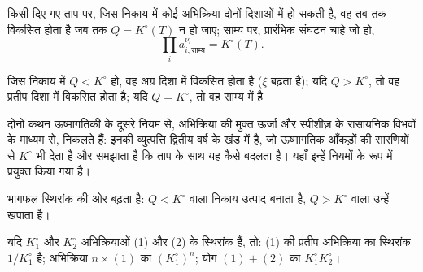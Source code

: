 \begin{theorem}[द्रव्य-अनुपाती क्रिया का नियम]\label{thm:b1:extent-q-and-k:mass-action}
किसी दिए गए ताप पर, जिस निकाय में कोई अभिक्रिया दोनों दिशाओं में
हो सकती है, वह तब तक विकसित होता है जब तक $Q = K^\circ(T)$ न हो जाए; साम्य पर,
प्रारंभिक संघटन चाहे जो हो,
\[
  \prod_i a_{i,\text{साम्य}}^{\nu_i} = K^\circ(T) .
\]
\end{theorem}
\admitted

\begin{proposition}[विकास की दिशा]\label{prop:b1:extent-q-and-k:direction}
जिस निकाय में $Q < K^\circ$ हो, वह अग्र दिशा में विकसित होता है ($\xi$
बढ़ता है); यदि $Q > K^\circ$, तो वह प्रतीप दिशा में विकसित होता है; यदि
$Q = K^\circ$, तो वह साम्य में है।
\end{proposition}
\admitted

\begin{remark}[ये नियम कहाँ से आते हैं]\label{rem:b1:extent-q-and-k:origin}
दोनों कथन ऊष्मागतिकी के दूसरे नियम से, अभिक्रिया की मुक्त ऊर्जा और स्पीशीज़ के
रासायनिक विभवों के माध्यम से, निकलते हैं: इनकी
व्युत्पत्ति द्वितीय वर्ष के खंड में है, जो ऊष्मागतिक आँकड़ों की सारणियों से
$K^\circ$ भी देता है और समझाता है कि ताप के साथ यह कैसे बदलता है। यहाँ
इन्हें नियमों के रूप में प्रयुक्त किया गया है।
\end{remark}

\begin{omfigure}

{\small भागफल स्थिरांक की ओर बढ़ता है: $Q <
K^\circ$ वाला निकाय उत्पाद बनाता है, $Q > K^\circ$ वाला उन्हें खपाता है।}
\end{omfigure}

\begin{proposition}[स्थिरांकों का संयोजन]\label{prop:b1:extent-q-and-k:combine-k}
यदि $K_1^\circ$ और $K_2^\circ$ अभिक्रियाओं (1) और (2) के स्थिरांक हैं, तो:
(1) की प्रतीप अभिक्रिया का स्थिरांक $1/K_1^\circ$ है; अभिक्रिया $n \times
(1)$ का $(K_1^\circ)^n$; योग $(1) + (2)$ का $K_1^\circ K_2^\circ$।
\end{proposition}

